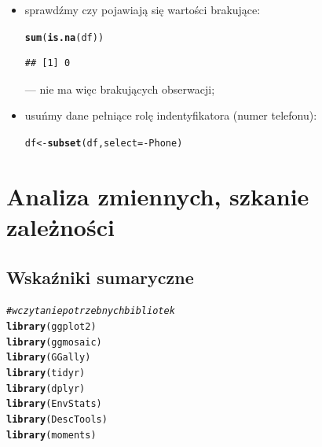\documentclass{article}\usepackage[]{graphicx}\usepackage[]{color}
\makeatletter
\newcommand{\hlcom}[1]{\textcolor[rgb]{0.678,0.584,0.686}{\textit{#1}}}%
\newcommand{\hlopt}[1]{\textcolor[rgb]{0,0,0}{#1}}%
\newcommand{\hlstd}[1]{\textcolor[rgb]{0.345,0.345,0.345}{#1}}%
\newcommand{\hlkwb}[1]{\textcolor[rgb]{0.69,0.353,0.396}{#1}}%
\newcommand{\hlkwc}[1]{\textcolor[rgb]{0.333,0.667,0.333}{#1}}%
\newcommand{\hlkwd}[1]{\textcolor[rgb]{0.737,0.353,0.396}{\textbf{#1}}}%
\newenvironment{kframe}{%
 \def\at@end@of@kframe{}%
 \ifinner\ifhmode%
  \def\at@end@of@kframe{\end{minipage}}%
  \begin{minipage}{\columnwidth}%
 \fi\fi%
 \def\FrameCommand##1{\hskip\@totalleftmargin \hskip-\fboxsep
 \colorbox{shadecolor}{##1}\hskip-\fboxsep
     \hskip-\linewidth \hskip-\@totalleftmargin \hskip\columnwidth}%
 \MakeFramed {\advance\hsize-\width
   \@totalleftmargin\z@ \linewidth\hsize
   \@setminipage}}%
 {\par\unskip\endMakeFramed%
 \at@end@of@kframe}
\newenvironment{knitrout}{}{} %
\makeatother
\begin{document}
\begin{itemize}
\item sprawdźmy czy pojawiają się wartości brakujące:
\begin{knitrout}
\color{fgcolor}\begin{kframe}
\begin{alltt}
\hlkwd{sum}\hlstd{(}\hlkwd{is.na}\hlstd{(df))}
\end{alltt}
\begin{verbatim}
## [1] 0
\end{verbatim}
\end{kframe}
\end{knitrout}
--- nie ma więc brakujących obserwacji;
\item usuńmy dane pełniące rolę indentyfikatora (numer telefonu):
\begin{knitrout}
\color{fgcolor}\begin{kframe}
\begin{alltt}
\hlstd{df} \hlkwb{<-} \hlkwd{subset}\hlstd{(df,} \hlkwc{select}\hlstd{=}\hlopt{-}\hlstd{Phone)}
\end{alltt}
\end{kframe}
\end{knitrout}

\end{itemize}

\section{Analiza zmiennych, szkanie zależności}

\subsection{Wskaźniki sumaryczne}


\begin{knitrout}
\color{fgcolor}\begin{kframe}
\begin{alltt}
\hlcom{# wczytanie potrzebnych bibliotek}
\hlkwd{library}\hlstd{(ggplot2)}
\hlkwd{library}\hlstd{(ggmosaic)}
\hlkwd{library}\hlstd{(GGally)}
\hlkwd{library}\hlstd{(tidyr)}
\hlkwd{library}\hlstd{(dplyr)}
\hlkwd{library}\hlstd{(EnvStats)}
\hlkwd{library}\hlstd{(DescTools)}
\hlkwd{library}\hlstd{(moments)}
\end{alltt}
\end{kframe}
\end{knitrout}
\end{document}
